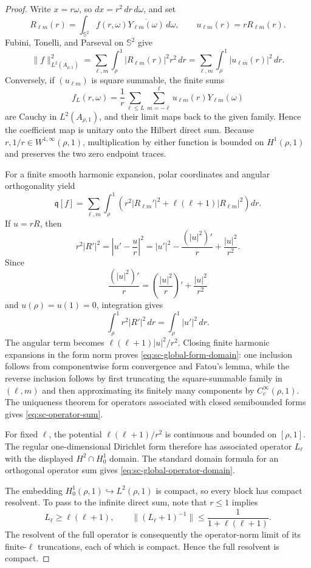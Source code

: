 \documentclass[11pt]{article}
\numberwithin{equation}{section}
\theoremstyle{definition}
\theoremstyle{remark}
\begin{document}
\begin{proof}
Write \(x=r\omega\), so \(dx=r^2\,dr\,d\omega\), and set
\[
  R_{\ell m}(r)=\int_{\mathbb S^2}
  f(r,\omega)\overline{Y_{\ell m}(\omega)}\,d\omega,
  \qquad u_{\ell m}(r)=rR_{\ell m}(r).
\]
Fubini, Tonelli, and Parseval on \(\mathbb S^2\) give
\[
  \|f\|_{L^2(A_{\rho,1})}^2
  =\sum_{\ell,m}\int_\rho^1|R_{\ell m}(r)|^2r^2\,dr
  =\sum_{\ell,m}\int_\rho^1|u_{\ell m}(r)|^2\,dr.
\]
Conversely, if \((u_{\ell m})\) is square summable, the finite sums
\[
  f_L(r,\omega)=\frac1r
  \sum_{\ell\le L}\sum_{m=-\ell}^{\ell}
  u_{\ell m}(r)Y_{\ell m}(\omega)
\]
are Cauchy in \(L^2(A_{\rho,1})\), and their limit maps back to the given
family.  Hence the coefficient map is unitary onto the Hilbert direct sum.
Because \(r,1/r\in W^{1,\infty}(\rho,1)\), multiplication by either function
is bounded on \(H^1(\rho,1)\) and preserves the two zero endpoint traces.

For a finite smooth harmonic expansion, polar coordinates and angular
orthogonality yield
\[
  \mathfrak q[f]=\sum_{\ell,m}\int_\rho^1
  \left(r^2|R_{\ell m}'|^2
  +\ell(\ell+1)|R_{\ell m}|^2\right)dr.
\]
If \(u=rR\), then
\[
  r^2|R'|^2
  =\left|u'-\frac ur\right|^2
  =|u'|^2-\frac{(|u|^2)'}r+\frac{|u|^2}{r^2}.
\]
Since
\[
  \frac{(|u|^2)'}r
  =\left(\frac{|u|^2}{r}\right)'
  +\frac{|u|^2}{r^2}
\]
and \(u(\rho)=u(1)=0\), integration gives
\[
  \int_\rho^1r^2|R'|^2\,dr
  =\int_\rho^1|u'|^2\,dr.
\]
The angular term becomes
\(\ell(\ell+1)|u|^2/r^2\).  Closing finite harmonic expansions in the
form norm proves \eqref{eq:sc-global-form-domain}: one inclusion follows
from componentwise form convergence and Fatou's lemma, while the reverse
inclusion follows by first truncating the square-summable family in
\((\ell,m)\) and then approximating its finitely many components by
\(C_c^\infty(\rho,1)\).  The uniqueness theorem for operators associated
with closed semibounded forms gives \eqref{eq:sc-operator-sum}.

For fixed \(\ell\), the potential \(\ell(\ell+1)/r^2\) is continuous and
bounded on \([\rho,1]\).  The regular one-dimensional Dirichlet form
therefore has associated operator \(L_\ell\) with the displayed
\(H^2\cap H_0^1\) domain.  The standard domain formula for an orthogonal
operator sum gives \eqref{eq:sc-global-operator-domain}.

The embedding \(H_0^1(\rho,1)\hookrightarrow L^2(\rho,1)\) is compact, so
every block has compact resolvent.  To pass to the infinite direct sum, note
that \(r\le1\) implies
\[
  L_\ell\ge\ell(\ell+1),
  \qquad
  \|(L_\ell+1)^{-1}\|
  \le\frac1{1+\ell(\ell+1)}.
\]
The resolvent of the full operator is consequently the operator-norm limit
of its finite-\(\ell\) truncations, each of which is compact.  Hence the full
resolvent is compact.


\end{proof}
\end{document}
